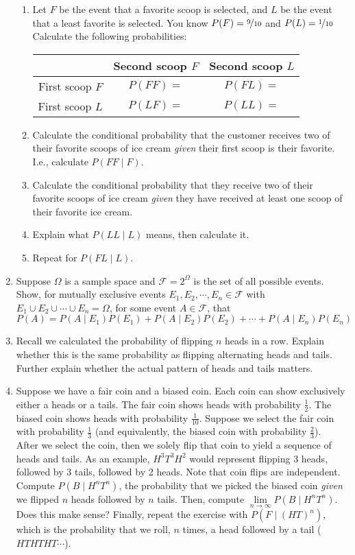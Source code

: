 \documentclass[main.tex]{subfiles}
\begin{document}
\begin{enumerate}
\begin{enumerate}
		\item
		Let \(F\) be the event that a favorite scoop is selected, and \(L\) be the event that a least favorite is selected.
		You know \(P(F) = \nicefrac{9}{10}\) and \(P(L) = \nicefrac{1}{10}\)
		Calculate the following probabilities:
		\begin{center}
			\begin{tabular}{c|cc}
				& Second scoop \(F\) & Second scoop \(L\) \\
				\hline
				First scoop \(F\) & \(P(FF) =\) & \(P(FL) =\) \\
				First scoop \(L\) & \(P(LF) =\) & \(P(LL) =\) \\
			\end{tabular}
		\end{center}
		\item
		Calculate the conditional probability that the customer receives two of their favorite scoops of ice cream \textit{given} their first scoop is their favorite.
		I.e., calculate \(P(FF \mid F)\).
		\item
		Calculate the conditional probability that they receive two of their favorite scoops of ice cream \textit{given} they have received at least one scoop of their favorite ice cream.
		\item
		Explain what \(P(LL \mid L)\) means, then calculate it.
		\item
		Repeat for \(P(FL \mid L)\).
	\end{enumerate}
	\item
	Suppose \(\Omega\) is a sample space and \(\mathcal{F} = 2^{\Omega}\) is the set of all possible events.
	Show, for mutually exclusive events \(E_1,E_2,\cdots,E_n \in \mathcal{F}\) with \(E_1 \cup E_2 \cup \cdots \cup E_n = \Omega\), for some event \(A \in \mathcal{F}\), that
	\[P(A) = P(A \mid E_1)P(E_1) + P(A \mid E_2)P(E_2) + \cdots + P(A \mid E_n)P(E_n)\]
	\item
	Recall we calculated the probability of flipping \(n\) heads in a row.
	Explain whether this is the same probability as flipping alternating heads and tails.
	Further explain whether the actual pattern of heads and tails matters.
	\item
	Suppose we have a fair coin and a biased coin.
	Each coin can show exclusively either a heads or a tails.
	The fair coin shows heads with probability \(\frac{1}{2}\).
	The biased coin shows heads with probability \(\frac{1}{10}\).
	Suppose we select the fair coin with probability \(\frac{1}{3}\) (and equivalently, the biased coin with probability \(\frac{2}{3}\)).
	After we select the coin, then we solely flip that coin to yield a sequence of heads and tails.
	As an example, \(H^3 T^3 H^2\) would represent flipping 3 heads, followed by 3 tails, followed by 2 heads.
	Note that coin flips are independent.
	Compute \(P(B \mid H^n T^n)\), the probability that we picked the biased coin \textit{given} we flipped \(n\) heads followed by \(n\) tails.
	Then, compute \(\lim\limits_{n \rightarrow \infty} P(B \mid H^n T^n)\).
	Does this make sense?
	Finally, repeat the exercise with \(P(F \mid (HT)^n)\), which is the probability that we roll, \(n\) times, a head followed by a tail (\(HTHTHT \cdots\)).
	

\end{enumerate}
\end{document}
